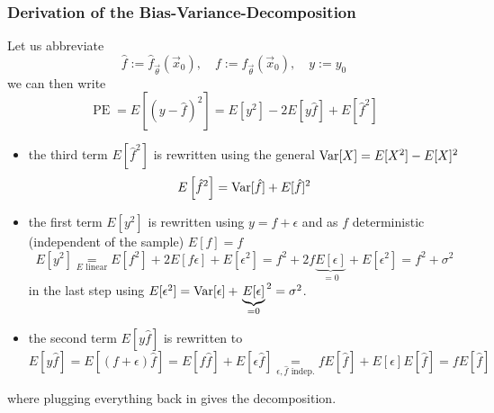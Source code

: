 \subsubsection{Derivation of the Bias-Variance-Decomposition}
Let us abbreviate
\begin{equation}
    \hat{f} := \hat{f}_{\vec{\theta}}(\vec{x}_0), \quad f := f_{\vec{\theta}}(\vec{x}_0), \quad y := y_0
\end{equation}
we can then write
\begin{equation}
    \operatorname{PE}=E\left[(y-\hat{f})^2\right]=E\left[y^2\right]-2 E[y \hat{f}]+E\left[\hat{f}^2\right]
\end{equation}
\begin{itemize}
    \item the third term $E\left[\hat{f}^2\right]$ is rewritten using the general $\operatorname{Var}[X] = E[X^2] - E[X]^2$
    \begin{equation}
        E\left[\hat{f}^2\right] = \operatorname{Var}[\hat{f}] + E[\hat{f}]^2
    \end{equation}
    \item the first term $E\left[y^2\right]$ is rewritten using $y = f + \epsilon$ and as $f$ deterministic (independent of the sample) $E[f] = f$
    \begin{equation}
        E\left[y^2\right] \underset{E\text{ linear}}{=} E\left[f^2\right] + 2E[f\epsilon] + E[\epsilon^2] = f^2 + 2f\underbrace{E[\epsilon]}_{=0} + E[\epsilon^2] = f^2 + \sigma^2
    \end{equation}
    in the last step using $E[\epsilon^2] = \operatorname{Var}[\epsilon] + \left.\underbrace{E[\epsilon]}_{=0}\right.^2 = \sigma^2$.
    \item the second term $E[y\hat{f}]$ is rewritten to
    \begin{equation}
        E[y\hat{f}] = E[(f+\epsilon)\hat{f}] = E[f\hat{f}] + E[\epsilon\hat{f}] \underset{\epsilon,\hat{f} \text{ indep.}}{=} fE[\hat{f}] + E[\epsilon]E[\hat{f}] = fE[\hat{f}]
    \end{equation}
\end{itemize}
where plugging everything back in gives the decomposition.


